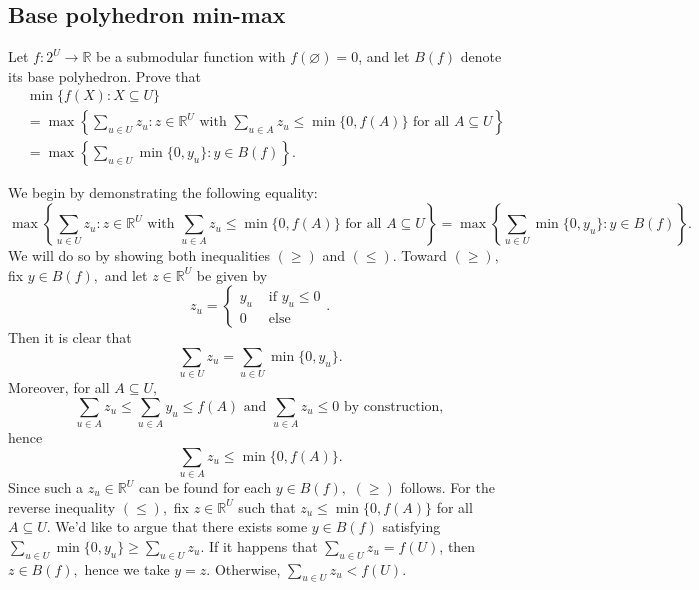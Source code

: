 \documentclass{article}
\let\emptyset\varnothing
\newcommand{\R}{\mathbb{R}}
\begin{document}
  \subsection{Base polyhedron min-max}
  \begin{centerframebox}
    Let $f: 2^U \to \R$ be a submodular function with $f(\emptyset) = 0$, and let $B(f)$ denote its base polyhedron. Prove that
    \begin{align*}
      &\min\{f(X):X\subseteq U\} \\
      &= \max\left\{\sum_{u\in U}z_{u}:z\in\R^U \textrm{ with } \sum_{u\in A}z_{u} \leq \min\{0,f(A)\} \textrm{ for all } A\subseteq U\right\} \\
      &=\max\left\{\sum_{u\in U} \min\{0, y_u\}: y\in B(f) \right\}.
    \end{align*}
  \end{centerframebox}
  We begin by demonstrating the following equality:
  \begin{equation}\max\left\{\sum_{u\in U}z_{u}:z\in\R^U \textrm{ with } \sum_{u\in A}z_{u} \leq \min\{0,f(A)\} \textrm{ for all } A\subseteq U\right\}=\max\left\{\sum_{u\in U} \min\{0, y_u\}: y\in B(f) \right\}.\end{equation}We will do so by showing both inequalities $(\geq)$ and $(\leq).$ Toward $(\geq),$ fix $y\in B(f),$ and let $z\in \mathbb{R}^U$ be given by
  $$z_u=\begin{cases}
      y_u & \text{ if }y_u\leq 0\\
      0 & \text{ else }
  \end{cases}.$$
  Then it is clear that $$\sum_{u\in U}z_u=\sum_{u\in U}\min\{0,y_u\}.$$Moreover, for all $A\subseteq U,$ $$\sum_{u\in A}z_u\leq \sum_{u\in A}y_u\leq f(A)\text{ and }\sum_{u\in A}z_u\leq 0\text{ by construction},$$hence $$\sum_{u\in A}z_u\leq \min\{0,f(A)\}.$$Since such a $z_u\in \mathbb{R}^U$ can be found for each $y\in B(f),$ $(\geq)$ follows. For the reverse inequality $(\leq),$ fix $z\in \R^U$ such that $z_u\leq \min\{0,f(A)\}$ for all $A\subseteq U.$ We'd like to argue that there exists some $y\in B(f)$ satisfying $\sum_{u\in U}\min\{0,y_u\}\geq \sum_{u\in U}z_u.$ If it happens that $\sum_{u\in U}z_u=f(U)$, then $z\in B(f),$ hence we take $y=z.$ Otherwise, $\sum_{u\in U}z_u<f(U).$ %



\end{document}
